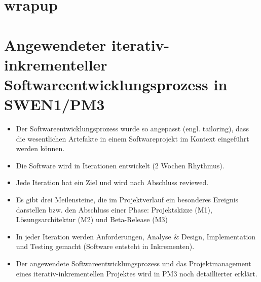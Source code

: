 \section{wrapup}

\section*{Angewendeter iterativ-inkrementeller Softwareentwicklungsprozess in SWEN1/PM3}
\begin{itemize}
  \item Der Softwareentwicklungsprozess wurde so angepasst (engl. tailoring), dass die wesentlichen Artefakte in einem Softwareprojekt im Kontext eingeführt werden können.
  \item Die Software wird in Iterationen entwickelt (2 Wochen Rhythmus).
  \item Jede Iteration hat ein Ziel und wird nach Abschluss reviewed.
  \item Es gibt drei Meilensteine, die im Projektverlauf ein besonderes Ereignis darstellen bzw. den Abschluss einer Phase: Projektskizze (M1), Lösungsarchitektur (M2) und Beta-Release (M3)
  \item In jeder Iteration werden Anforderungen, Analyse \& Design, Implementation und Testing gemacht (Software entsteht in Inkrementen).
  \item Der angewendete Softwareentwicklungsprozess und das Projektmanagement eines iterativ-inkrementellen Projektes wird in PM3 noch detaillierter erklärt.
\end{itemize}

